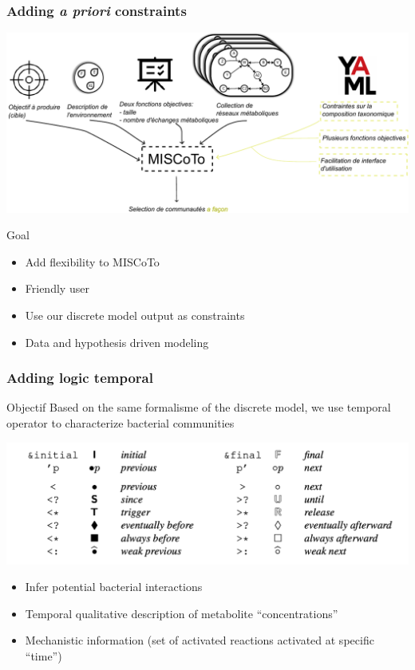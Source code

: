 \documentclass[8pt,usenames,dvipsnames]{beamer}
\begin{document}

\begin{frame}
\frametitle{Adding \textit{a priori} constraints}

\includegraphics[width=\textwidth]{figures/enrichissement.pdf}
\begin{block}{Goal}
\begin{itemize}
\item Add flexibility to MISCoTo \tiny \citep{Frioux2018}
\item \normalsize Friendly user
\item Use our discrete model output as constraints
\item Data and hypothesis driven modeling
\end{itemize}
\end{block}
\end{frame}

\begin{frame}
\frametitle{Adding logic temporal}
\begin{block}{Objectif}
Based on the same formalisme of the discrete model, we use temporal operator to characterize bacterial communities
\end{block}

\includegraphics[width=\textwidth]{figures/syntaxe_telingo.pdf}

\begin{block}{}
\begin{itemize}
\item Infer potential bacterial interactions
\item Temporal qualitative description of metabolite ``concentrations''
\item Mechanistic information (set of activated reactions activated at specific ``time'')
\end{itemize}
\end{block}

\end{frame}
\end{document}
